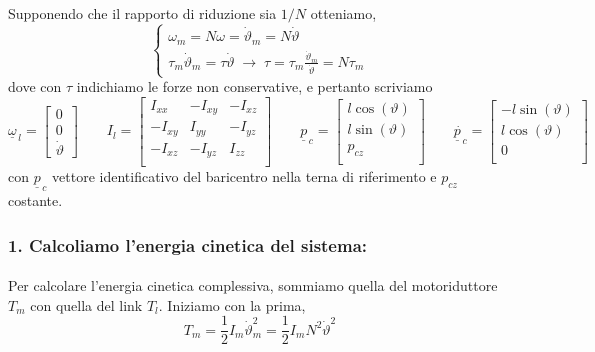 Supponendo che il rapporto di riduzione sia $1/N$ otteniamo, 
\begin{equation}
	\begin{cases}
		\omega_m = N\omega = \dot{\vartheta}_m = N \dot{\vartheta} \\
		\tau_m \dot{\vartheta}_m = \tau \dot{\vartheta} \; \rightarrow \; \tau = \tau_m \frac{\dot{\vartheta}_m}{\dot{\vartheta}} = N \tau_m
	\end{cases}
\end{equation}
dove con $\tau$ indichiamo le forze non conservative, e pertanto scriviamo
\begin{equation*}
	\underline{\omega}_{\,l} = 
	\begin{bmatrix}
		0 \\ 0 \\ \dot{\vartheta}
	\end{bmatrix}
	\qquad I_l = 
	\begin{bmatrix}
		I_{xx} & -I_{xy} & -I_{xz} \\
		-I_{xy} & I_{yy} & -I_{yz} \\
		-I_{xz} & -I_{yz} & I_{zz} \\
	\end{bmatrix}
	\qquad \underline{p}_{\,c} =
	\begin{bmatrix}
		l \cos(\vartheta) \\ 
		l \sin(\vartheta) \\
		p_{cz} \\
	\end{bmatrix} 
	\qquad \dot{\underline{p}_{\,c}} = 
	\begin{bmatrix}
		-l \sin(\vartheta) \\
		l \cos(\vartheta) \\
		0 \\
	\end{bmatrix}
\end{equation*}
con $\underline{p}_{\,c}$ vettore identificativo del baricentro nella terna di riferimento e $p_{cz}$ costante.

\subsubsection{1. Calcoliamo l'energia cinetica del sistema:}
\paragraph{}
Per calcolare l'energia cinetica complessiva, sommiamo quella del motoriduttore $T_m$ con quella del link $T_l$. Iniziamo con la prima,
\begin{equation}
	T_m = \frac{1}{2} I_m \dot{\vartheta}_m^2 = \frac{1}{2}I_m N^2 \dot{\vartheta}^2
\end{equation}

